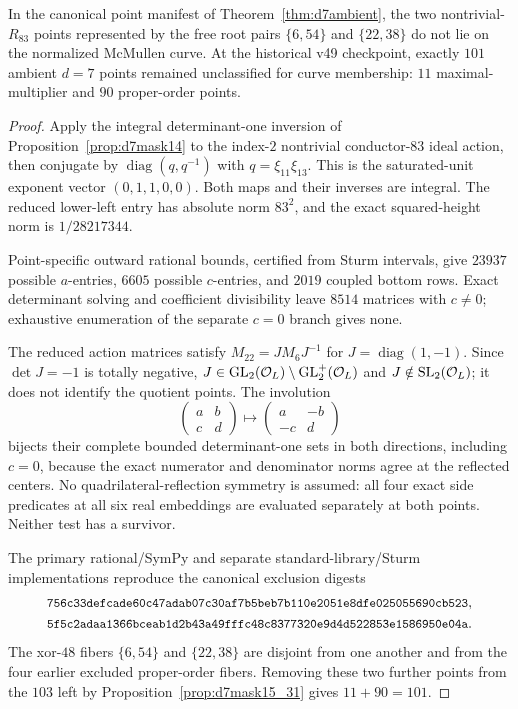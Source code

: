 \begin{proposition}[A third pair of proper-order $d=7$ exclusions]\label{prop:d7mask6_22}
In the canonical point manifest of Theorem~\ref{thm:d7ambient}, the
two nontrivial-$R_{83}$ points represented by the free root pairs
$\{6,54\}$ and $\{22,38\}$ do not lie on the normalized McMullen curve.
At the historical v49 checkpoint, exactly $101$ ambient $d=7$ points
remained unclassified for curve membership: $11$ maximal-multiplier and $90$ proper-order points.
\end{proposition}
\begin{proof}
Apply the integral determinant-one inversion of
Proposition~\ref{prop:d7mask14} to the index-$2$ nontrivial conductor-$83$
ideal action, then conjugate by $\operatorname{diag}(q,q^{-1})$ with
$q=\xi_{11}\xi_{13}$.  This is the saturated-unit exponent vector
$(0,1,1,0,0)$. Both maps and their inverses are integral. The reduced
lower-left entry has absolute norm $83^2$, and the exact squared-height norm is
$1/28217344$.

Point-specific outward rational bounds, certified from Sturm intervals, give
$23937$ possible $a$-entries, $6605$ possible $c$-entries, and $2019$ coupled
bottom rows. Exact determinant solving and coefficient divisibility leave
$8514$ matrices with $c\ne0$; exhaustive enumeration of the separate $c=0$
branch gives none.

The reduced action matrices satisfy $M_{22}=JM_6J^{-1}$ for
$J=\operatorname{diag}(1,-1)$. Since $\det J=-1$ is totally negative,
$J\in\operatorname{GL}_2(\mathcal O_L)\setminus\operatorname{GL}_2^+(\mathcal O_L)$ and $J\notin\operatorname{SL}_2(\mathcal O_L)$; it does not
identify the quotient points. The involution
\[
 \begin{pmatrix}a&b\\c&d\end{pmatrix}
 \longmapsto
 \begin{pmatrix}a&-b\\-c&d\end{pmatrix}
\]
bijects their complete bounded determinant-one sets in both directions,
including $c=0$, because the exact numerator and denominator norms agree at
the reflected centers. No quadrilateral-reflection symmetry is assumed: all
four exact side predicates at all six real embeddings are evaluated separately
at both points. Neither test has a survivor.

The primary rational/SymPy and separate standard-library/Sturm implementations
reproduce the canonical exclusion digests
\[
\begin{gathered}
\digest{756c33defcade60c47adab07c30af7b5}{beb7b110e2051e8dfe025055690cb523},\\
\digest{5f5c2adaa1366bceab1d2b43a49fffc4}{8c8377320e9d4d522853e1586950e04a}.
\end{gathered}
\]
The xor-$48$ fibers $\{6,54\}$ and $\{22,38\}$ are disjoint from one another
and from the four earlier excluded proper-order fibers. Removing these two
further points from the $103$ left by Proposition~\ref{prop:d7mask15_31}
gives $11+90=101$.
\end{proof}


